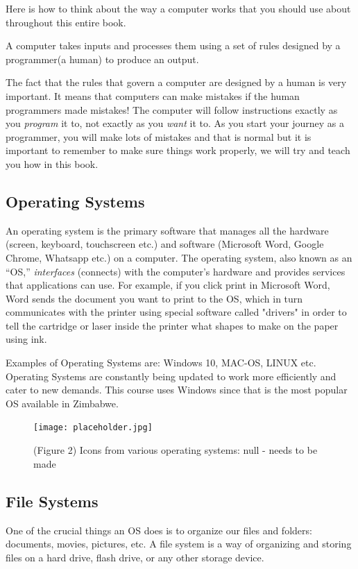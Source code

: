 Here is how to think about the way a computer works that you should use about throughout this entire book. 
\begin{remark}
A computer takes inputs and processes them using a set of rules designed by a programmer(a human) to produce an output.
\end{remark}

The fact that the rules that govern a computer are designed by a human is very important. It means that computers can make mistakes if the human programmers made mistakes! The computer will follow instructions exactly as you \textit{program} it to, not exactly as you \textit{want} it to. As you start your journey as a programmer, you will make lots of mistakes and that is normal but it is important to remember to make sure things work properly, we will try and teach you how in this book.

\subsection{Operating Systems}

An operating system is the primary software that manages all the hardware  (screen, keyboard, touchscreen etc.) and software (Microsoft Word, Google Chrome, Whatsapp etc.) on a computer. The operating system, also known as an “OS,” \textit{interfaces} (connects) with the computer’s hardware and provides services that applications can use. For example, if you click print in Microsoft Word, Word sends the document you want to print to the OS, which in turn communicates with the printer using special software called "drivers" in order to tell the cartridge or laser inside the printer what shapes to make on the paper using ink.

Examples of Operating Systems are: Windows 10, MAC-OS, LINUX etc. Operating Systems are constantly being updated to work more efficiently and cater to new demands. This course uses Windows since that is the most popular OS available in Zimbabwe.
%
\begin{figure}[h]
\centering\texttt{[image: placeholder.jpg]}
\caption{(Figure 2) Icons from various operating systems: {null - needs to be made}}
\label{fig:placeholder} %
\end{figure}
%

\subsection{File Systems}
One of the crucial things an OS does is to organize our files and folders: documents, movies, pictures, etc. A file system is a way of organizing and storing files on a hard drive, flash drive, or any other storage device.

